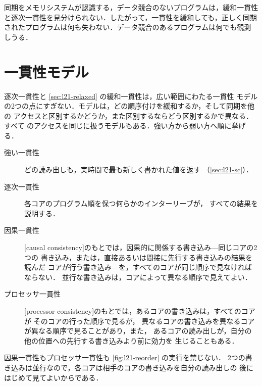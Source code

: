 \documentclass[../main.tex]{subfiles}
\begin{document}
\begin{keypoint}
  同期をメモリシステムが認識する，データ競合のないプログラムは，緩和一貫性
  と逐次一貫性を見分けられない．したがって，一貫性を緩和しても，正しく同期
  されたプログラムは何も失わない．データ競合のあるプログラムは何でも観測
  しうる．
\end{keypoint}

\section{一貫性モデル}
\label{sec:l21-models}

逐次一貫性と \cref{sec:l21-relaxed} の緩和一貫性は，広い範囲にわたる一貫性
モデルの2つの点にすぎない．モデルは，どの順序付けを緩和するか，そして同期を他の
アクセスと区別するかどうか，また区別するならどう区別するかで異なる．すべて
のアクセスを同じに扱うモデルもある．強い方から弱い方へ順に挙げる．
\begin{description}
  \item[強い一貫性] どの読み出しも，実時間で最も新しく書かれた値を返す
    （\cref{sec:l21-sc}）．
  \item[逐次一貫性] 各コアのプログラム順を保つ何らかのインターリーブが，
    すべての結果を説明する．
  \item[因果一貫性] [causal
    consistency]のもとでは，因果的に関係する書き込み---同じコアの2つの
    書き込み，または，直接あるいは間接に先行する書き込みの結果を読んだ
    コアが行う書き込み---を，すべてのコアが同じ順序で見なければならない．
    並行な書き込みは，コアによって異なる順序で見えてよい．
  \item[プロセッサ一貫性] [processor
    consistency]のもとでは，あるコアの書き込みは，すべてのコアが
    そのコアの行った順序で見るが，
    異なるコアの書き込みを異なるコアが異なる順序で見ることがあり，また，
    あるコアの読み出しが，自分の他の位置への先行する書き込みより前に効力を
    生じることもある．
\end{description}
因果一貫性もプロセッサ一貫性も \cref{fig:l21-reorder} の実行を禁じない．
2つの書き込みは並行なので，各コアは相手のコアの書き込みを自分の読み出しの
後にはじめて見てよいからである．
\end{document}
